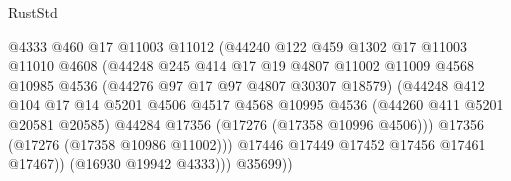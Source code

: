 \begin{lexlean}{RustStd}
\begin{coremodule}
                                        @4333
                                        @460
                                        @17
                                        @11003
                                        @11012
                                        (@44240
                                          @122
                                          @459
                                          @1302
                                          @17
                                          @11003
                                          @11010
                                          @4608
                                          (@44248
                                            @245
                                            @414
                                            @17
                                            @19
                                            @4807
                                            @11002
                                            @11009
                                            @4568
                                            @10985
                                            @4536
                                            (@44276 @97 @17 @97 @4807 @30307 @18579)
                                            (@44248
                                              @412
                                              @104
                                              @17
                                              @14
                                              @5201
                                              @4506
                                              @4517
                                              @4568
                                              @10995
                                              @4536
                                              (@44260 @411 @5201 @20581 @20585)
                                              @44284
                                              @17356
                                              (@17276 (@17358 @10996 @4506)))
                                            @17356
                                            (@17276 (@17358 @10986 @11002)))
                                          @17446
                                          @17449
                                          @17452
                                          @17456
                                          @17461
                                          @17467))
                                      (@16930 @19942 @4333)))
                                  @35699))

\end{coremodule}
\end{lexlean}
